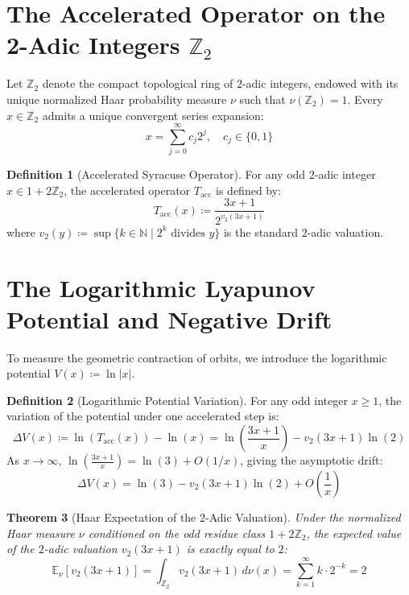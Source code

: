 \documentclass[11pt,a4paper]{article}
\newtheorem{theorem}{Theorem}[section]
\theoremstyle{definition}
\newtheorem{definition}[theorem]{Definition}
\begin{document}
\section{The Accelerated Operator on the 2-Adic Integers \texorpdfstring{$\mathbb{Z}_2$}{Z2}}
Let $\mathbb{Z}_2$ denote the compact topological ring of $2$-adic integers, endowed with its unique normalized Haar probability measure $\nu$ such that $\nu(\mathbb{Z}_2) = 1$.
Every $x \in \mathbb{Z}_2$ admits a unique convergent series expansion:
\begin{equation}
x = \sum_{j=0}^\infty c_j 2^j, \quad c_j \in \{0, 1\}
\end{equation}

\begin{definition}[Accelerated Syracuse Operator]
For any odd $2$-adic integer $x \in 1 + 2\mathbb{Z}_2$, the accelerated operator $T_{\mathrm{acc}}$ is defined by:
\begin{equation}
T_{\mathrm{acc}}(x) \coloneqq \frac{3x + 1}{2^{v_2(3x+1)}}
\end{equation}
where $v_2(y) \coloneqq \sup \{ k \in \mathbb{N} \mid 2^k \text{ divides } y \}$ is the standard $2$-adic valuation.
\end{definition}

\section{The Logarithmic Lyapunov Potential and Negative Drift}
To measure the geometric contraction of orbits, we introduce the logarithmic potential $V(x) \coloneqq \ln|x|$.

\begin{definition}[Logarithmic Potential Variation]
For any odd integer $x \ge 1$, the variation of the potential under one accelerated step is:
\begin{equation}
\Delta V(x) \coloneqq \ln\left( T_{\mathrm{acc}}(x) \right) - \ln(x) = \ln\left( \frac{3x+1}{x} \right) - v_2(3x+1) \ln(2)
\end{equation}
As $x \to \infty$, $\ln\left(\frac{3x+1}{x}\right) = \ln(3) + O(1/x)$, giving the asymptotic drift:
\begin{equation}
\Delta V(x) = \ln(3) - v_2(3x+1) \ln(2) + O\left(\frac{1}{x}\right)
\end{equation}
\end{definition}

\begin{theorem}[Haar Expectation of the 2-Adic Valuation]\label{thm:haar_expectation}
Under the normalized Haar measure $\nu$ conditioned on the odd residue class $1 + 2\mathbb{Z}_2$, the expected value of the $2$-adic valuation $v_2(3x+1)$ is exactly equal to $2$:
\begin{equation}\label{eq:haar_int}
\mathbb{E}_{\nu}[v_2(3x+1)] = \int_{\mathbb{Z}_2} v_2(3x+1) \, d\nu(x) = \sum_{k=1}^\infty k \cdot 2^{-k} = 2
\end{equation}
\end{theorem}
\end{document}
